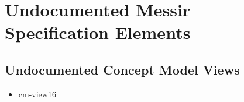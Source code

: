 	
\chapter{Undocumented Messir Specification Elements}





















\section[Undocumented Concept Model Views]{Undocumented Concept Model Views}
\begin{itemize}
\item cm-view16 
\end{itemize}










